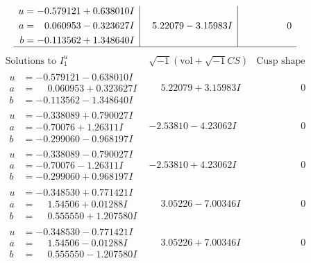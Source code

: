 \documentclass[1p]{elsarticle_modified}
\theoremstyle{definition}
\newcommand{\I}{\sqrt{-1}}
\begin{document}
$$\begin{array}{c|c|c}
\begin{aligned}
u &= -0.579121 + 0.638010 I \\
a &= \phantom{-}0.060953 - 0.323627 I \\
b &= -0.113562 + 1.348640 I\end{aligned}
 & \phantom{-}5.22079 - 3.15983 I & \phantom{-0.000000 } 0\\
 \hline 
 \end{array}$$\newpage$$\begin{array}{c|c|c}  
\text{Solutions to }I^u_{1}& \I (\text{vol} + \sqrt{-1}CS) & \text{Cusp shape}\\
 \hline 
\begin{aligned}
u &= -0.579121 - 0.638010 I \\
a &= \phantom{-}0.060953 + 0.323627 I \\
b &= -0.113562 - 1.348640 I\end{aligned}
 & \phantom{-}5.22079 + 3.15983 I & \phantom{-0.000000 } 0 \\ \hline\begin{aligned}
u &= -0.338089 + 0.790027 I \\
a &= -0.70076 + 1.26311 I \\
b &= -0.299060 - 0.968197 I\end{aligned}
 & -2.53810 - 4.23062 I & \phantom{-0.000000 } 0 \\ \hline\begin{aligned}
u &= -0.338089 - 0.790027 I \\
a &= -0.70076 - 1.26311 I \\
b &= -0.299060 + 0.968197 I\end{aligned}
 & -2.53810 + 4.23062 I & \phantom{-0.000000 } 0 \\ \hline\begin{aligned}
u &= -0.348530 + 0.771421 I \\
a &= \phantom{-}1.54506 + 0.01288 I \\
b &= \phantom{-}0.555550 + 1.207580 I\end{aligned}
 & \phantom{-}3.05226 - 7.00346 I & \phantom{-0.000000 } 0 \\ \hline\begin{aligned}
u &= -0.348530 - 0.771421 I \\
a &= \phantom{-}1.54506 - 0.01288 I \\
b &= \phantom{-}0.555550 - 1.207580 I\end{aligned}
 & \phantom{-}3.05226 + 7.00346 I & \phantom{-0.000000 } 0 \\ \hline\begin{aligned}

\end{aligned}
\end{array}$$
\end{document}
